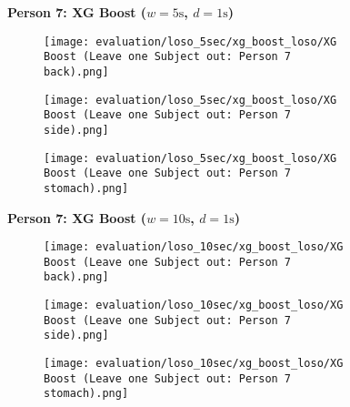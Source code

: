\begin{figure}
    \textbf{Person 7: XG Boost ($w=5\si{\s}$, $d=1\si{\s}$)}
      \centering
      \begin{subfigure}{1\textwidth}
          \texttt{[image: evaluation/loso\_5sec/xg\_boost\_loso/XG Boost (Leave one Subject out: Person 7 back).png]}
        \end{subfigure}
        \begin{subfigure}{1\textwidth}
          \texttt{[image: evaluation/loso\_5sec/xg\_boost\_loso/XG Boost (Leave one Subject out: Person 7 side).png]}
        \end{subfigure}
        \begin{subfigure}{1\textwidth}
          \texttt{[image: evaluation/loso\_5sec/xg\_boost\_loso/XG Boost (Leave one Subject out: Person 7 stomach).png]}
      \end{subfigure}
        \textbf{Person 7: XG Boost ($w=10\si{\s}$, $d=1\si{\s}$)}
      \centering
      \begin{subfigure}{1\textwidth}
          \texttt{[image: evaluation/loso\_10sec/xg\_boost\_loso/XG Boost (Leave one Subject out: Person 7 back).png]}
        \end{subfigure}
        \begin{subfigure}{1\textwidth}
          \texttt{[image: evaluation/loso\_10sec/xg\_boost\_loso/XG Boost (Leave one Subject out: Person 7 side).png]}
        \end{subfigure}
        \begin{subfigure}{1\textwidth}
          \texttt{[image: evaluation/loso\_10sec/xg\_boost\_loso/XG Boost (Leave one Subject out: Person 7 stomach).png]}
      \end{subfigure}
  
      \label{evaluation:xgboost_loso:person7}
\end{figure}

